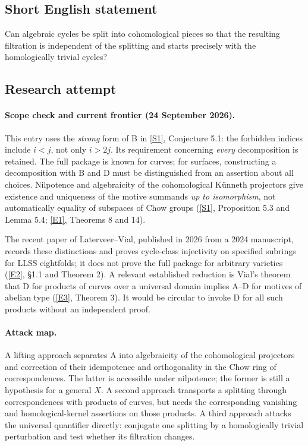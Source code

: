 \documentclass[11pt]{article}
\newcommand{\sref}[2]{\hyperlink{source:#1:#2}{[S#2]}}
\newcommand{\eref}[2]{\hyperlink{extra:#1:#2}{[E#2]}}
\begin{document}
\subsection{Short English statement}
Can algebraic cycles be split into cohomological pieces so that the resulting filtration is independent of the splitting and starts precisely with the homologically trivial cycles?
\subsection{Research attempt}

\paragraph{Scope check and current frontier (24 September 2026).}
This entry uses the \emph{strong} form of B in \sref{153}{1}, Conjecture 5.1:
the forbidden indices include $i<j$, not only $i>2j$.  Its requirement concerning
\emph{every} decomposition is retained.  The full package is known for curves;
for surfaces, constructing a decomposition with B and D must be distinguished
from an assertion about all choices.  Nilpotence and algebraicity of the
cohomological K\"unneth projectors give existence and uniqueness of the motive
summands \emph{up to isomorphism}, not automatically equality of subspaces of
Chow groups (\sref{153}{1}, Proposition 5.3 and Lemma 5.4;
\eref{153}{1}, Theorems 8 and 14).

The recent paper of Laterveer--Vial, published in 2026 from a 2024 manuscript,
records these distinctions and proves cycle-class injectivity on specified
subrings for LLSS eightfolds; it does not prove the full package for arbitrary
varieties (\eref{153}{2}, \S1.1 and Theorem 2).
A relevant established reduction is Vial's theorem that D for products of
curves over a universal domain implies A--D for motives of abelian type
(\eref{153}{3}, Theorem 3).  It would be circular to invoke D for all such
products without an independent proof.

\paragraph{Attack map.}
A lifting approach separates A into algebraicity of the cohomological
projectors and correction of their idempotence and orthogonality in the Chow
ring of correspondences.  The latter is accessible under nilpotence; the
former is still a hypothesis for a general $X$.  A second approach transports
a splitting through correspondences with products of curves, but needs the
corresponding vanishing and homological-kernel assertions on those products.
A third approach attacks the universal quantifier directly: conjugate one
splitting by a homologically trivial perturbation and test whether its
filtration changes.
\end{document}
